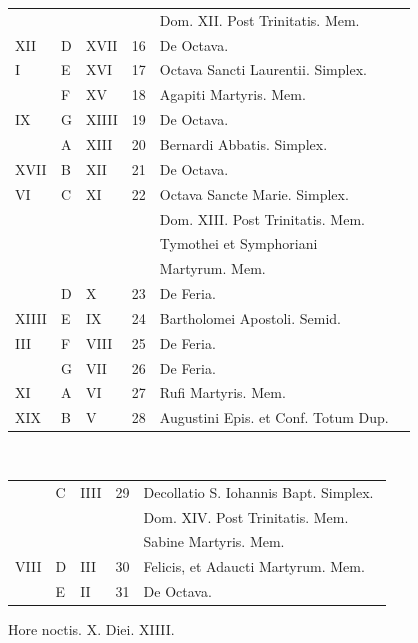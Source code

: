 \begin{center}
\begin{tabular}{l | l | l | r | l l}
 &  &  &  & \quad Dom. XII. Post Trinitatis. Mem. \\
\color{Red} XII & D & \color{Red} XVII & 16 & De Octava. & \color{Red} \\
\color{Red} I & E & \color{Red} XVI & 17 & Octava Sancti Laurentii. Simplex. & \color{Red} \\
\color{Red}  & F & \color{Red} XV & 18 & Agapiti Martyris. Mem. & \\
\color{Red} IX & G & \color{Red} XIIII & 19 & De Octava. & \color{Red} \\
\color{Red}  & \color{Red} A & \color{Red} XIII & 20 & Bernardi Abbatis. Simplex. & \color{Red} \\
\color{Red} XVII & B & \color{Red} XII & 21 & De Octava. & \color{Red} \\
\color{Red} VI & C & \color{Red} XI & 22 & \color{Red} Octava Sancte Marie. Simplex. \\
 &  &  &  & \quad Dom. XIII. Post Trinitatis. Mem. \\
& & & & \multicolumn{2}{l}{\quad \color{Red} Tymothei et Symphoriani} \\
& & & & \multicolumn{2}{l}{\quad \color{Red} Martyrum. Mem.} \\
\color{Red}  & D & \color{Red} X & 23 & De Feria. & \color{Red} \\
\color{Red} XIIII & E & \color{Red} IX & 24 & Bartholomei Apostoli. \color{Red} Semid. & \color{Red} \\
\color{Red} III & F & \color{Red} VIII & 25 & De Feria. & \color{Red} \\
\color{Red}  & G & \color{Red} VII & 26 & De Feria. & \color{Red} \\
\color{Red} XI & \color{Red} A & \color{Red} VI & 27 & \color{Red} Rufi Martyris. Mem. \\
\color{Red} XIX & B & \color{Red} V & 28 & \color{Red} Augustini Epis. et Conf. Totum Dup. & \color{Red} \\
\end{tabular}
\newline  
\end{center}

\begin{center}
\begin{tabular}{l | l | l | r | l l}
\color{Red}  & C & \color{Red} IIII & 29 & \multicolumn{2}{l}{Decollatio S. Iohannis Bapt. Simplex.} \\
 &  &  &  & \quad Dom. XIV. Post Trinitatis. Mem. \\
 &  & &  & \quad Sabine Martyris. Mem. \\
\color{Red} VIII & D & \color{Red} III & 30 & \color{Red} Felicis, et Adaucti Martyrum. Mem. \\
\color{Red}  & E & \color{Red} II & 31 & De Octava. \\
\end{tabular}
\newline \color{Red} Hore noctis. X. Diei. XIIII.
\end{center}



